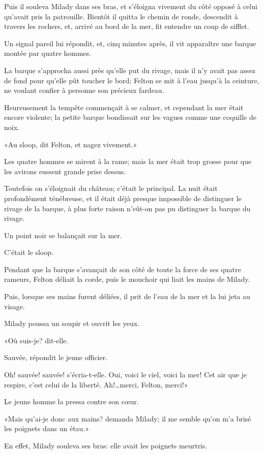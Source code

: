 Puis il souleva Milady dans ses bras, et s'éloigna vivement du côté opposé à celui qu'avait pris la patrouille. Bientôt il quitta le chemin de ronde, descendit à travers les rochers, et, arrivé au bord de la mer, fit entendre un coup de sifflet. 

Un signal pareil lui répondit, et, cinq minutes après, il vit apparaître une barque montée par quatre hommes. 

La barque s'approcha aussi près qu'elle put du rivage, mais il n'y avait pas assez de fond pour qu'elle pût toucher le bord; Felton se mit à l'eau jusqu'à la ceinture, ne voulant confier à personne son précieux fardeau. 

Heureusement la tempête commençait à se calmer, et cependant la mer était encore violente; la petite barque bondissait sur les vagues comme une coquille de noix. 

«Au sloop, dit Felton, et nagez vivement.» 

Les quatre hommes se mirent à la rame; mais la mer était trop grosse pour que les avirons eussent grande prise dessus. 

Toutefois on s'éloignait du château; c'était le principal. La nuit était profondément ténébreuse, et il était déjà presque impossible de distinguer le rivage de la barque, à plus forte raison n'eût-on pas pu distinguer la barque du rivage. 

Un point noir se balançait sur la mer. 

C'était le sloop. 

Pendant que la barque s'avançait de son côté de toute la force de ses quatre rameurs, Felton déliait la corde, puis le mouchoir qui liait les mains de Milady. 

Puis, lorsque ses mains furent déliées, il prit de l'eau de la mer et la lui jeta au visage. 

Milady poussa un soupir et ouvrit les yeux. 

«Où suis-je? dit-elle. 

\speak  Sauvée, répondit le jeune officier. 

\speak  Oh! sauvée! sauvée! s'écria-t-elle. Oui, voici le ciel, voici la mer! Cet air que je respire, c'est celui de la liberté. Ah!\dots merci, Felton, merci!» 

Le jeune homme la pressa contre son cœur. 

«Mais qu'ai-je donc aux mains? demanda Milady; il me semble qu'on m'a brisé les poignets dans un étau.» 

En effet, Milady souleva ses bras: elle avait les poignets meurtris. 

